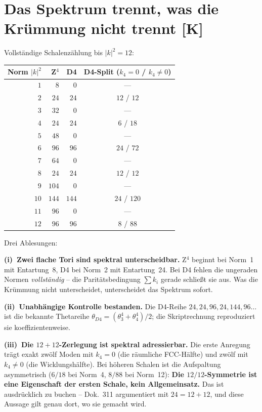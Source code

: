 \chapter{Das Spektrum trennt, was die Krümmung nicht trennt [K]}

Vollständige Schalenzählung bis $|k|^2 = 12$:

\begin{center}
\begin{tabular}{rrrc}
\toprule
Norm $|k|^2$ & Z$^4$ & D4 & D4-Split ($k_4{=}0$ / $k_4{\ne}0$) \\
\midrule
$1$ & $8$ & $0$ & --- \\
$2$ & $24$ & $24$ & $12$ / $12$ \\
$3$ & $32$ & $0$ & --- \\
$4$ & $24$ & $24$ & $6$ / $18$ \\
$5$ & $48$ & $0$ & --- \\
$6$ & $96$ & $96$ & $24$ / $72$ \\
$7$ & $64$ & $0$ & --- \\
$8$ & $24$ & $24$ & $12$ / $12$ \\
$9$ & $104$ & $0$ & --- \\
$10$ & $144$ & $144$ & $24$ / $120$ \\
$11$ & $96$ & $0$ & --- \\
$12$ & $96$ & $96$ & $8$ / $88$ \\
\bottomrule
\end{tabular}
\end{center}

Drei Ablesungen:

\textbf{(i)~Zwei flache Tori sind spektral unterscheidbar.} Z$^4$
beginnt bei Norm~1 mit Entartung~8, D4 bei Norm~2 mit Entartung~24.
Bei D4 fehlen die ungeraden Normen \emph{vollständig} -- die
Paritätsbedingung $\sum k_i$ gerade schließt sie aus. Was die
Krümmung nicht unterscheidet, unterscheidet das Spektrum sofort.

\textbf{(ii)~Unabhängige Kontrolle bestanden.} Die D4-Reihe
$24, 24, 96, 24, 144, 96 \dots$ ist die bekannte Thetareihe
$\theta_{D4} = (\theta_3^4 + \theta_4^4)/2$; die Skriptrechnung
reproduziert sie koeffizientenweise.

\textbf{(iii)~Die $12+12$-Zerlegung ist spektral adressierbar.} Die
erste Anregung trägt exakt zwölf Moden mit $k_4 = 0$ (die räumliche
FCC-Hälfte) und zwölf mit $k_4 \ne 0$ (die Wicklungshälfte). Bei
höheren Schalen ist die Aufspaltung asymmetrisch ($6/18$ bei Norm~4,
$8/88$ bei Norm~12): \textbf{Die $12/12$-Symmetrie ist eine
Eigenschaft der ersten Schale, kein Allgemeinsatz.} Das ist
ausdrücklich zu buchen -- Dok.~311 argumentiert mit $24 = 12+12$,
und diese Aussage gilt genau dort, wo sie gemacht wird.

